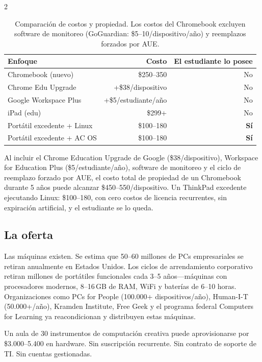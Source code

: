 \documentclass[11pt, a4paper]{article}
\begin{document}
\begin{multicols}{2}
\begin{table}[H]
\small
\centering
\begin{tabular}{lrr}
\toprule
\textbf{Enfoque} & \textbf{Costo} & \textbf{El estudiante lo posee} \\
\midrule
Chromebook (nuevo) & \$250--350 & No \\
Chrome Edu Upgrade & +\$38/dispositivo & No \\
Google Workspace Plus & +\$5/estudiante/año & No \\
iPad (edu) & \$299+ & No \\
\midrule
Portátil excedente + Linux & \$100--180 & \textbf{Sí} \\
Portátil excedente + AC OS & \$100--180 & \textbf{Sí} \\
\bottomrule
\end{tabular}
\caption{Comparación de costos y propiedad. Los costos del Chromebook excluyen software de monitoreo (GoGuardian: \$5--10/dispositivo/año) y reemplazos forzados por AUE.}
\label{tab:cost}
\end{table}

Al incluir el Chrome Education Upgrade de Google (\$38/dispositivo), Workspace for Education Plus (\$5/estudiante/año), software de monitoreo y el ciclo de reemplazo forzado por AUE, el costo total de propiedad de un Chromebook durante 5 años puede alcanzar \$450--550/dispositivo. Un ThinkPad excedente ejecutando Linux: \$100--180, con cero costos de licencia recurrentes, sin expiración artificial, y el estudiante se lo queda.

\subsection{La oferta}

Las máquinas existen. Se estima que 50--60 millones de PCs empresariales se retiran anualmente en Estados Unidos. Los ciclos de arrendamiento corporativo retiran millones de portátiles funcionales cada 3--5 años---máquinas con procesadores modernos, 8--16\,GB de RAM, WiFi y baterías de 6--10 horas. Organizaciones como PCs for People (100.000+ dispositivos/año), Human-I-T (50.000+/año), Kramden Institute, Free Geek y el programa federal Computers for Learning ya reacondicionan y distribuyen estas máquinas.

Un aula de 30 instrumentos de computación creativa puede aprovisionarse por \$3.000--5.400 en hardware. Sin suscripción recurrente. Sin contrato de soporte de TI. Sin cuentas gestionadas.


\end{multicols}
\end{document}
